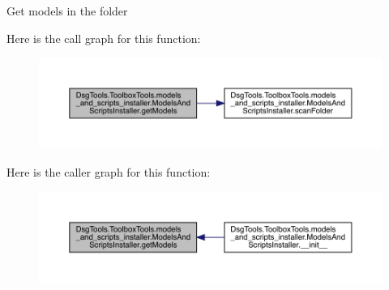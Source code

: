\begin{DoxyVerb}Get models in the folder
\end{DoxyVerb}
 Here is the call graph for this function\+:
\nopagebreak
\begin{figure}[H]
\begin{center}
\leavevmode
\includegraphics[width=350pt]{class_dsg_tools_1_1_toolbox_tools_1_1models__and__scripts__installer_1_1_models_and_scripts_installer_aff387a740caa2fbe603543e786cbc1d5_cgraph}
\end{center}
\end{figure}
Here is the caller graph for this function\+:
\nopagebreak
\begin{figure}[H]
\begin{center}
\leavevmode
\includegraphics[width=350pt]{class_dsg_tools_1_1_toolbox_tools_1_1models__and__scripts__installer_1_1_models_and_scripts_installer_aff387a740caa2fbe603543e786cbc1d5_icgraph}
\end{center}
\end{figure}
\mbox{\label{class_dsg_tools_1_1_toolbox_tools_1_1models__and__scripts__installer_1_1_models_and_scripts_installer_a482ce617c048b98130cd7b5c827eab06}} 
